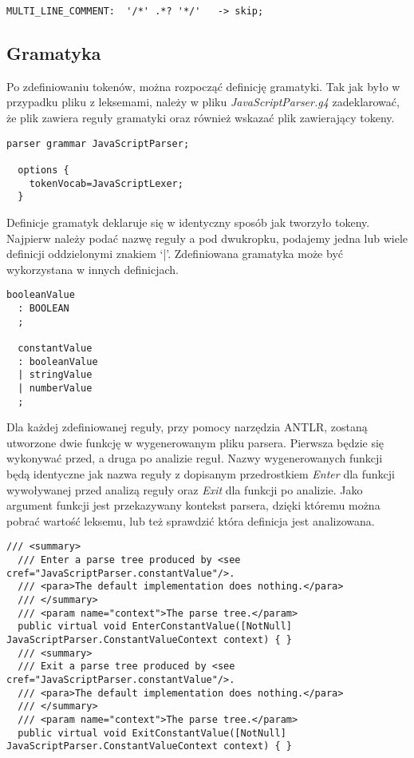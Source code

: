 \begin{lstlisting}[caption=Przykład użycia komendy \texttt{skip}, label=alg:antlrLex5]
  MULTI_LINE_COMMENT:  '/*' .*? '*/'   -> skip;
\end{lstlisting}

\subsection{Gramatyka}
Po zdefiniowaniu tokenów, można rozpocząć definicję gramatyki. Tak jak było w przypadku pliku z leksemami, należy w pliku \textit{JavaScriptParser.g4} zadeklarować, że plik zawiera reguły gramatyki oraz również wskazać plik zawierający tokeny.

\begin{lstlisting}[caption=Deklaracja pliku do analizy gramatyki, label=alg:antlrGr1]
  parser grammar JavaScriptParser;

  options {
    tokenVocab=JavaScriptLexer;
  }
\end{lstlisting}

Definicje gramatyk deklaruje się w identyczny sposób jak tworzyło tokeny. Najpierw należy podać nazwę reguły a pod dwukropku, podajemy jedna lub wiele definicji oddzielonymi znakiem `|'. Zdefiniowana gramatyka może być wykorzystana w innych definicjach. 

\begin{lstlisting}[caption=Przykład definicji reguły gramatyki, label=alg:antlrGr1]
  booleanValue
  : BOOLEAN
  ;

  constantValue
  : booleanValue
  | stringValue
  | numberValue
  ;
\end{lstlisting}

\par Dla każdej zdefiniowanej reguły, przy pomocy narzędzia ANTLR, zostaną utworzone dwie funkcję w wygenerowanym pliku parsera. Pierwsza będzie się wykonywać przed, a druga po analizie reguł. Nazwy wygenerowanych funkcji będą identyczne jak nazwa reguły z dopisanym przedrostkiem \textit{Enter} dla funkcji wywoływanej przed analizą reguły oraz \textit{Exit} dla funkcji po analizie. Jako argument funkcji jest przekazywany kontekst parsera, dzięki któremu można pobrać wartość leksemu, lub też sprawdzić która definicja jest analizowana.

\begin{lstlisting}[language=CSharp, caption=Przykład wygenerowanych funkcji gramatyki parsera, label=alg:antlrGr2]
  /// <summary>
  /// Enter a parse tree produced by <see cref="JavaScriptParser.constantValue"/>.
  /// <para>The default implementation does nothing.</para>
  /// </summary>
  /// <param name="context">The parse tree.</param>
  public virtual void EnterConstantValue([NotNull] JavaScriptParser.ConstantValueContext context) { }
  /// <summary>
  /// Exit a parse tree produced by <see cref="JavaScriptParser.constantValue"/>.
  /// <para>The default implementation does nothing.</para>
  /// </summary>
  /// <param name="context">The parse tree.</param>
  public virtual void ExitConstantValue([NotNull] JavaScriptParser.ConstantValueContext context) { }
\end{lstlisting}

